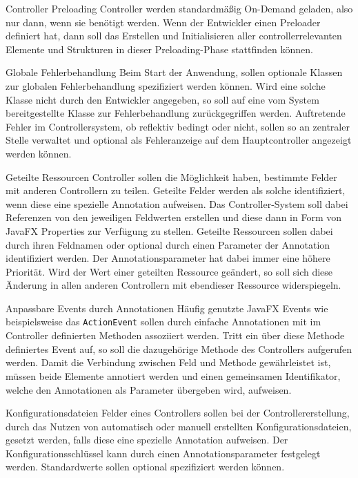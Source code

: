 \begin{freq}{Controller Preloading}
	Controller werden standardmäßig On-Demand geladen, also nur dann, wenn sie benötigt werden. Wenn der Entwickler einen Preloader definiert hat, dann soll das Erstellen und Initialisieren aller controllerrelevanten Elemente und Strukturen in dieser Preloading-Phase stattfinden können.
\end{freq}
\begin{freq}{Globale Fehlerbehandlung}
	Beim Start der Anwendung, sollen optionale Klassen zur globalen Fehlerbehandlung spezifiziert werden können. Wird eine solche Klasse nicht durch den Entwickler angegeben, so soll auf eine vom System bereitgestellte Klasse zur Fehlerbehandlung zurückgegriffen werden. Auftretende Fehler im Controllersystem, ob reflektiv bedingt oder nicht, sollen so an zentraler Stelle verwaltet und optional als Fehleranzeige auf dem Hauptcontroller angezeigt werden können.
\end{freq}
\begin{freq}{Geteilte Ressourcen}
	Controller sollen die Möglichkeit haben, bestimmte Felder mit anderen Controllern zu teilen. Geteilte Felder werden als solche identifiziert, wenn diese eine spezielle Annotation aufweisen. Das Controller-System soll dabei Referenzen von den jeweiligen Feldwerten erstellen und diese dann in Form von JavaFX Properties zur Verfügung zu stellen. Geteilte Ressourcen sollen dabei durch ihren Feldnamen oder optional durch einen Parameter der Annotation identifiziert werden. Der Annotationsparameter hat dabei immer eine höhere Priorität. Wird der Wert einer geteilten Ressource geändert, so soll sich diese Änderung in allen anderen Controllern mit ebendieser Ressource widerspiegeln.
\end{freq}
\begin{freq}{Anpassbare Events durch Annotationen}
	Häufig genutzte JavaFX Events wie beispielsweise das \texttt{ActionEvent} sollen durch einfache Annotationen mit im Controller definierten Methoden assoziiert werden. Tritt ein über diese Methode definiertes Event auf, so soll die dazugehörige Methode des Controllers aufgerufen werden. Damit die Verbindung zwischen Feld und Methode gewährleistet ist, müssen beide Elemente annotiert werden und einen gemeinsamen Identifikator, welche den Annotationen als Parameter übergeben wird, aufweisen.
\end{freq}
\begin{freq}{Konfigurationsdateien}
	Felder eines Controllers sollen bei der Controllererstellung, durch das Nutzen von automatisch oder manuell erstellten Konfigurationsdateien, gesetzt werden, falls diese eine spezielle Annotation aufweisen. Der Konfigurationsschlüssel kann durch einen Annotationsparameter festgelegt werden. Standardwerte sollen optional spezifiziert werden können.
\end{freq}
